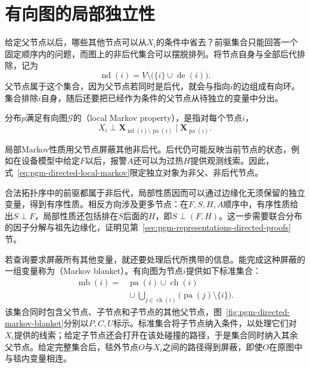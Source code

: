 \section{有向图的局部独立性}
\label{sec:pgm-directed-local}

给定父节点以后，哪些其他节点可以从$X_i$的条件中省去？前驱集合只能回答一个固定顺序内的问题，而图上的非后代集合可以摆脱排列。将节点自身与全部后代排除，记为
\[
  \operatorname{nd}(i)=V\setminus\bigl(\{i\}\cup\operatorname{de}(i)\bigr).
\]
父节点属于这个集合，因为父节点若同时是后代，就会与指向$i$的边组成有向环。集合排除$i$自身，随后还要把已经作为条件的父节点从待独立的变量中分出。

\begin{definition}[局部Markov性质]
  \label{def:pgm-directed-local-markov}
  分布$p$满足有向图$\mathcal{G}$的（local Markov property），是指对每个节点$i$，
  \begin{equation}
    X_i\perp
    \bm{X}_{\operatorname{nd}(i)\setminus\operatorname{pa}(i)}
    \mid\bm{X}_{\operatorname{pa}(i)}.
    \label{eq:pgm-directed-local-markov}
  \end{equation}
\end{definition}

局部Markov性质用父节点屏蔽其他非后代。后代仍可能反映当前节点的状态，例如在设备模型中给定$F$以后，报警$A$还可以为过热$H$提供观测线索。因此，式~\eqref{eq:pgm-directed-local-markov}限定独立对象为非父、非后代节点。

合法拓扑序中的前驱都属于非后代，局部性质因而可以通过边缘化无须保留的独立变量，得到有序性质。相反方向涉及更多节点：在$F,S,H,A$顺序中，有序性质给出$S\perp F$，局部性质还包括排在$S$后面的$H$，即$S\perp(F,H)$。这一步需要联合分布的因子分解与祖先边缘化，证明见第~\ref{sec:pgm-representations-directed-proofs}节。

若查询要求屏蔽所有其他变量，就还要处理后代所携带的信息。能完成这种屏蔽的一组变量称为（Markov blanket）。有向图为节点$i$提供如下标准集合：
\begin{equation}
  \begin{aligned}
    \operatorname{mb}(i)
    ={}&\operatorname{pa}(i)\cup\operatorname{ch}(i)\\
       &{}\cup\bigcup_{j\in\operatorname{ch}(i)}
           \bigl(\operatorname{pa}(j)\setminus\{i\}\bigr).
  \end{aligned}
  \label{eq:pgm-directed-blanket}
\end{equation}
该集合同时包含父节点、子节点和子节点的其他父节点，图~\ref{fig:pgm-directed-markov-blanket}分别以$P,C,U$标示。标准集合将子节点纳入条件，以处理它们对$X_i$提供的线索；给定子节点还会打开在该处碰撞的路径，于是集合同时纳入其余父节点。给定完整集合后，毯外节点$O$与$X_i$之间的路径得到屏蔽，即使$O$在原图中与毯内变量相连。

